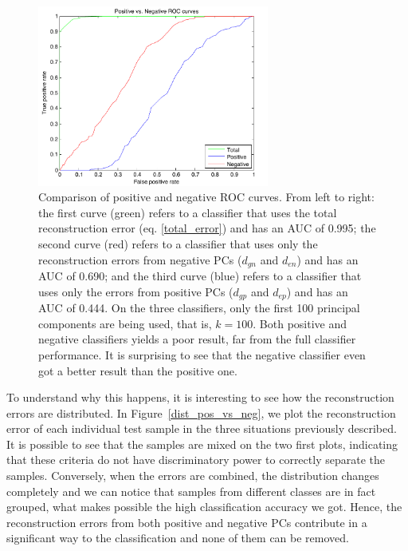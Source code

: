 \documentclass[10pt, conference, compsocconf]{IEEEtran}
\begin{document}
\begin{figure}[b!]
\centering
\includegraphics[width=3in]{roc_pos_vs_neg}
\caption{Comparison of positive and negative ROC curves. From left to right: the first curve (green) refers to a classifier that uses the total reconstruction error (eq. \ref{total_error}) and has an AUC of 0.995; the second curve (red) refers to a classifier that uses only the reconstruction errors from negative PCs ($d_{gn}$ and $d_{en}$) and has an AUC of 0.690; and the third curve (blue) refers to a classifier that uses only the errors from positive PCs ($d_{gp}$ and $d_{ep}$) and has an AUC of 0.444. On the three classifiers, only the first 100 principal components are being used, that is, $k=100$. Both positive and negative classifiers yields a poor result, far from the full classifier performance. It is surprising to see that the negative classifier even got a better result than the positive one.}
\label{roc_pos_vs_neg}
\end{figure}

To understand why this happens, it is interesting to see how the reconstruction errors are distributed. In Figure~\ref{dist_pos_vs_neg}, we plot the reconstruction error of each individual test sample in the three situations previously described. It is possible to see that the samples are mixed on the two first plots, indicating that these criteria do not have discriminatory power to correctly separate the samples. Conversely, when the errors are combined, the distribution changes completely and we can notice that samples from different classes are in fact grouped, what makes possible the high classification accuracy we got. Hence, the reconstruction errors from both positive and negative PCs contribute in a significant way to the classification and none of them can be removed.
\end{document}
